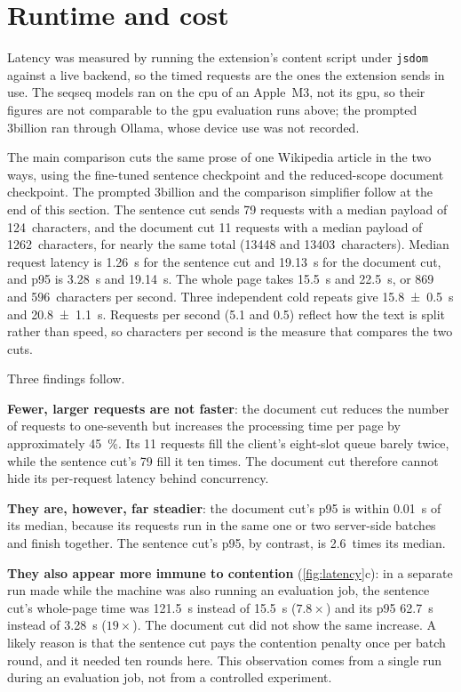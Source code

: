 \section{Runtime and cost}
\label{sec:runtime}

Latency was measured by running the extension's content script under \texttt{jsdom} against a live backend, so the timed requests are the ones the extension sends in use.
The \gls{seqseq} models ran on the \gls{cpu} of an Apple~M3, not its \gls{gpu}, so their figures are not comparable to the \gls{gpu} evaluation runs above; the prompted 3\gls{billion} ran through Ollama, whose device use was not recorded.

The main comparison cuts the same prose of one Wikipedia article in the two ways, using the fine-tuned sentence checkpoint and the reduced-scope document checkpoint.
The prompted 3\gls{billion} and the comparison simplifier follow at the end of this section.
The sentence cut sends 79 requests with a median payload of \num{124}~characters, and the document cut 11 requests with a median payload of \num{1262}~characters, for nearly the same total (\num{13448} and \num{13403}~characters).
Median request latency is \qty{1.26}{\second} for the sentence cut and \qty{19.13}{\second} for the document cut, and \gls{p95} is \qty{3.28}{\second} and \qty{19.14}{\second}.
The whole page takes \qty{15.5}{\second} and \qty{22.5}{\second}, or \num{869} and \num{596}~characters per second.
Three independent cold repeats give \qty{15.8 \pm 0.5}{\second} and \qty{20.8 \pm 1.1}{\second}.
Requests per second (\num{5.1} and \num{0.5}) reflect how the text is split rather than speed, so characters per second is the measure that compares the two cuts.

Three findings follow.

\textbf{Fewer, larger requests are not faster}: the document cut reduces the number of requests to one-seventh but increases the processing time per page by approximately \qty{45}{\percent}.
Its 11 requests fill the client's eight-slot queue barely twice, while the sentence cut's 79 fill it ten times.
The document cut therefore cannot hide its per-request latency behind concurrency.

\textbf{They are, however, far steadier}: the document cut's \gls{p95} is within \qty{0.01}{\second} of its median, because its requests run in the same one or two server-side batches and finish together.
The sentence cut's \gls{p95}, by contrast, is \num{2.6}~times its median.

\textbf{They also appear more immune to contention} (\cref{fig:latency}c): in a separate run made while the machine was also running an evaluation job, the sentence cut's whole-page time was \qty{121.5}{\second} instead of \qty{15.5}{\second} (\(7.8\times\)) and its \gls{p95} \qty{62.7}{\second} instead of \qty{3.28}{\second} (\(19\times\)).
The document cut did not show the same increase.
A likely reason is that the sentence cut pays the contention penalty once per batch round, and it needed ten rounds here.
This observation comes from a single run during an evaluation job, not from a controlled experiment.

